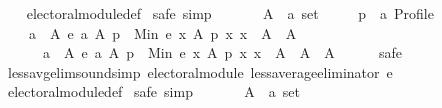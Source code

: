 \begin{isabellebody}
%
\isadelimproof
\ \ %
\endisadelimproof
%
\isatagproof
{}\isamarkupfalse%
\ electoral{\isacharunderscore}{\kern0pt}module{\isacharunderscore}{\kern0pt}def\isanewline
{}\isamarkupfalse%
\ {\isacharparenleft}{\kern0pt}safe{\isacharcomma}{\kern0pt}\ simp{\isacharparenright}{\kern0pt}\isanewline
\ \ \isamarkupfalse%
\isanewline
\ \ \ \ A\ {\isacharcolon}{\kern0pt}{\isacharcolon}{\kern0pt}\ {\isachardoublequoteopen}{\isacharprime}{\kern0pt}a\ set{\isachardoublequoteclose}\ \isanewline
\ \ \ \ p\ {\isacharcolon}{\kern0pt}{\isacharcolon}{\kern0pt}\ {\isachardoublequoteopen}{\isacharprime}{\kern0pt}a\ Profile{\isachardoublequoteclose}\isanewline
\ \ \isamarkupfalse%
\isanewline
\ \ \ \ {\isachardoublequoteopen}{\isacharbraceleft}{\kern0pt}a\ {\isasymin}\ A{\isachardot}{\kern0pt}\ e\ a\ A\ p\ {\isasymle}\ Min\ {\isacharbraceleft}{\kern0pt}e\ x\ A\ p\ {\isacharbar}{\kern0pt}x{\isachardot}{\kern0pt}\ x\ {\isasymin}\ A{\isacharbraceright}{\kern0pt}{\isacharbraceright}{\kern0pt}\ {\isasymnoteq}\ A\ {\isasymlongrightarrow}\isanewline
\ \ \ \ \ \ {\isacharbraceleft}{\kern0pt}a\ {\isasymin}\ A{\isachardot}{\kern0pt}\ e\ a\ A\ p\ {\isasymle}\ Min\ {\isacharbraceleft}{\kern0pt}e\ x\ A\ p\ {\isacharbar}{\kern0pt}x{\isachardot}{\kern0pt}\ x\ {\isasymin}\ A{\isacharbraceright}{\kern0pt}{\isacharbraceright}{\kern0pt}\ {\isasymunion}\ A\ {\isacharequal}{\kern0pt}\ A{\isachardoublequoteclose}\isanewline
\ \ \ \ \isamarkupfalse%
\ safe\isanewline
{}\isamarkupfalse%
%
\endisatagproof
{\isafoldproof}%
%
\isadelimproof
\isanewline
%
\endisadelimproof
\isanewline
{}\isamarkupfalse%
\ less{\isacharunderscore}{\kern0pt}avg{\isacharunderscore}{\kern0pt}elim{\isacharunderscore}{\kern0pt}sound{\isacharbrackleft}{\kern0pt}simp{\isacharbrackright}{\kern0pt}{\isacharcolon}{\kern0pt}\ {\isachardoublequoteopen}electoral{\isacharunderscore}{\kern0pt}module\ {\isacharparenleft}{\kern0pt}less{\isacharunderscore}{\kern0pt}average{\isacharunderscore}{\kern0pt}eliminator\ e{\isacharparenright}{\kern0pt}{\isachardoublequoteclose}\isanewline
%
\isadelimproof
\ \ %
\endisadelimproof
%
\isatagproof
{}\isamarkupfalse%
\ electoral{\isacharunderscore}{\kern0pt}module{\isacharunderscore}{\kern0pt}def\isanewline
{}\isamarkupfalse%
\ {\isacharparenleft}{\kern0pt}safe{\isacharcomma}{\kern0pt}\ simp{\isacharparenright}{\kern0pt}\isanewline
\ \ \isamarkupfalse%
\isanewline
\ \ \ \ A\ {\isacharcolon}{\kern0pt}{\isacharcolon}{\kern0pt}\ {\isachardoublequoteopen}{\isacharprime}{\kern0pt}a\ set{\isachardoublequoteclose}\ \isanewline

\end{isabellebody}
